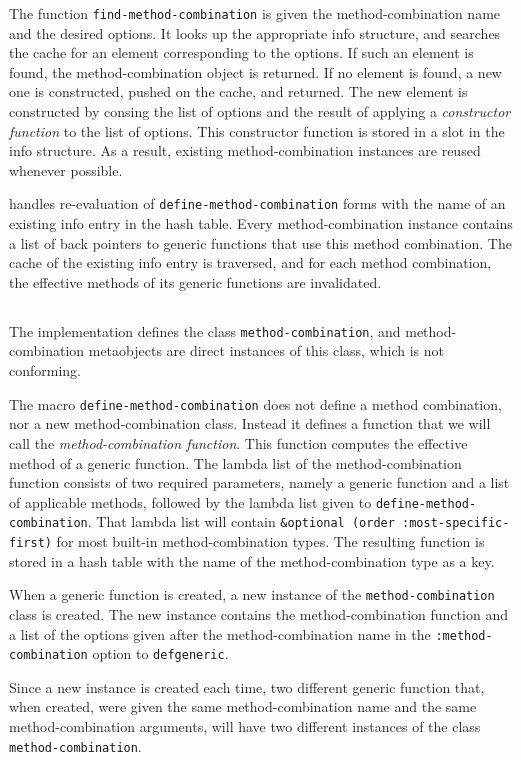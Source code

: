 The function \texttt{find-method-combination} is given the
method-combination name and the desired options.  It looks up the
appropriate info structure, and searches the cache for an element
corresponding to the options.  If such an element is found, the
method-combination object is returned.  If no element is found, a new
one is constructed, pushed on the cache, and returned.  The new
element is constructed by consing the list of options and the result
of applying a \emph{constructor function} to the list of options.
This constructor function is stored in a slot in the info structure.
As a result, existing method-combination instances are reused whenever
possible.

\sbcl{} handles re-evaluation of \texttt{define-method-combination}
forms with the name of an existing info entry in the hash table.
Every method-combination instance contains a list of back pointers to
generic functions that use this method combination.  The cache of the
existing info entry is traversed, and for each method combination, the
effective methods of its generic functions are invalidated.

\subsection{\ecl{}}

The \ecl{} \commonlisp{} implementation defines the class
\texttt{method-combination}, and method-combination metaobjects are
direct instances of this class, which is not conforming.

The macro \texttt{define-method-combination} does not define a method
combination, nor a new method-combination class.  Instead it defines a
function that we will call the \emph{method-combination function}.
This function computes the effective method of a generic function.
The lambda list of the method-combination function consists of two
required parameters, namely a generic function and a list of
applicable methods, followed by the lambda list given to
\texttt{define-method-combination}.  That lambda list will contain
\texttt{\&optional (order :most-specific-first)} for most built-in
method-combination types.  The resulting function is stored in a hash
table with the name of the method-combination type as a key.

When a generic function is created, a new instance of the
\texttt{method-combination} class is created.  The new instance
contains the method-combination function and a list of the options
given after the method-combination name in the
\texttt{:method-combination} option to \texttt{defgeneric}.

Since a new instance is created each time, two different generic
function that, when created, were given the same method-combination
name and the same method-combination arguments, will have two
different instances of the class \texttt{method-combination}.
